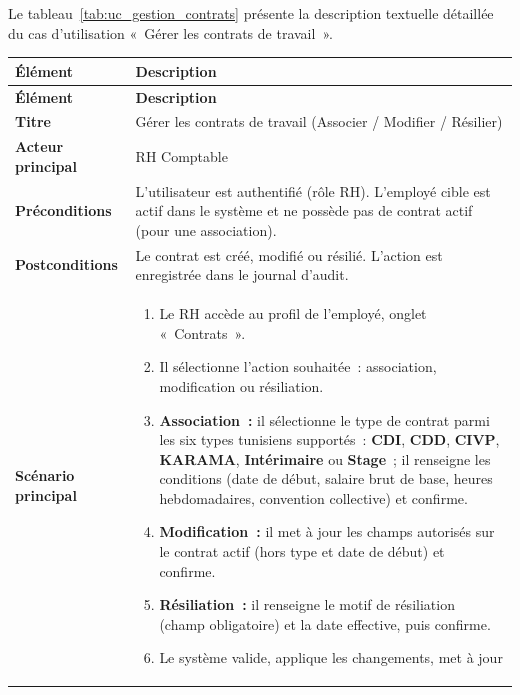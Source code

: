 Le tableau~\ref{tab:uc_gestion_contrats} présente la description
textuelle détaillée du cas d'utilisation «~Gérer les contrats de
travail~».
\vspace{0.2cm}
\begin{xltabular}{\textwidth}{|l|X|}
    \hline
     \textbf{Élément} & \textbf{Description} \\ \hline
    \endfirsthead
    \hline
     \textbf{Élément} & \textbf{Description} \\ \hline
    \endhead
    \hline
    \endfoot
    \endlastfoot

    \textbf{Titre} & Gérer les contrats de travail
        (Associer / Modifier / Résilier) \\ \hline
    \textbf{Acteur principal} & RH Comptable \\ \hline
    \textbf{Préconditions} & L'utilisateur est authentifié (rôle RH).
        L'employé cible est actif dans le système et ne possède pas de
        contrat actif (pour une association). \\ \hline
    \textbf{Postconditions} & Le contrat est créé, modifié ou résilié.
        L'action est enregistrée dans le journal d'audit. \\ \hline
    \textbf{Scénario principal} &
    \begin{enumerate}[nosep, leftmargin=*]
        \item Le RH accède au profil de l'employé, onglet «~Contrats~».
        \item Il sélectionne l'action souhaitée~: association,
              modification ou résiliation.
        \item \textbf{Association~:} il sélectionne le type de contrat
              parmi les six types tunisiens supportés~:
              \textbf{CDI}, \textbf{CDD},
              \textbf{CIVP}, \textbf{KARAMA}, \textbf{Intérimaire} ou \textbf{Stage}~;
              il renseigne les conditions (date de début, salaire brut
              de base, heures hebdomadaires, convention collective)
              et confirme.
        \item \textbf{Modification~:} il met à jour les champs autorisés
              sur le contrat actif (hors type et date de début) et confirme.
        \item \textbf{Résiliation~:} il renseigne le motif de résiliation
              (champ obligatoire) et la date effective, puis confirme.
        \item Le système valide, applique les changements, met à jour

\end{enumerate}
\end{xltabular}
